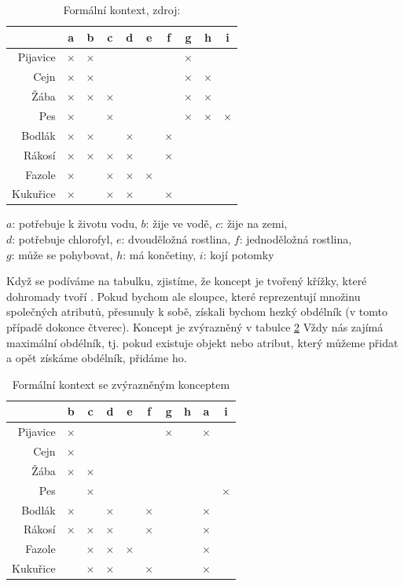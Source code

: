 \documentclass[12pt]{article}
\newcommand{\yes}{$\times$}
\newcommand{\fyes}{\fbox{$\times$}}
\begin{document}
\begin{table}
\begin{center}
\begin{tabular}{r|ccccccccc}
\toprule
&a&b&c&d&e&f&g&h&i\\
\midrule
Pijavice&\yes&\yes&&&&&\yes\\
Cejn&\yes&\yes&&&&&\yes&\yes\\
Žába&\yes&\yes&\yes&&&&\yes&\yes\\
Pes&\yes&&\yes&&&&\yes&\yes&\yes\\
Bodlák&\yes&\yes&&\yes&&\yes\\
Rákosí&\yes&\yes&\yes&\yes&&\yes\\
Fazole&\yes&&\yes&\yes&\yes\\
Kukuřice&\yes&&\yes&\yes&&\yes\\
\bottomrule
\end{tabular}
\end{center}
\caption{Formální kontext, zdroj: \cite{belfcaskr}} \label{tab.con1}

\begin{center}
$a$: potřebuje k životu vodu, $b$: žije ve vodě, $c$: žije na zemi,\\ $d$: potřebuje chlorofyl, $e$: dvouděložná rostlina, $f$: jednoděložná rostlina,\\ $g$: může se pohybovat, $h$: má končetiny, $i$: kojí potomky
\end{center}
\end{table}

Když se podíváme na tabulku, zjistíme, že koncept je tvořený křížky, které dohromady tvoří . Pokud bychom ale sloupce, které reprezentují množinu společných atributů, přesunuly k sobě, získali bychom hezký obdélník (v tomto případě dokonce čtverec). Koncept je zvýrazněný v tabulce \ref{tab.con2} Vždy nás zajímá maximální obdélník, tj. pokud existuje objekt nebo atribut, který můžeme přidat a opět získáme obdélník, přidáme ho. 

\begin{table}
\begin{center}
\begin{tabular}{r|ccccccccc}
\toprule
&b&c&d&e&f&g&h&a&i\\
\midrule
Pijavice&\yes&&&&&\yes&&\yes\\
Cejn&\yes&&&&&\fyes&\fyes&\fyes\\
Žába&\yes&\yes&&&&\fyes&\fyes&\fyes\\
Pes&&\yes&&&&\fyes&\fyes&\fyes&\yes\\
Bodlák&\yes&&\yes&&\yes&&&\yes\\
Rákosí&\yes&\yes&\yes&&\yes&&&\yes\\
Fazole&&\yes&\yes&\yes&&&&\yes\\
Kukuřice&&\yes&\yes&&\yes&&&\yes\\
\bottomrule
\end{tabular}
\end{center}
\caption{Formální kontext se zvýrazněným konceptem} \label{tab.con2}
\end{table}
\end{document}

